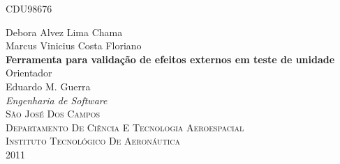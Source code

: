\begin{titlepage}
	
\begin{flushright}
\textsc{\scriptsize CDU98676}\\[1cm]	
\end{flushright}

\begin{center}
	
\textnormal{\normalsize Debora Alvez Lima Chama\\Marcus Vinicius Costa Floriano}\\[3cm]

\textnormal{\large \bfseries Ferramenta para validação de efeitos externos em teste de unidade}\\[3cm]

\textnormal{\small Orientador}\\[0cm]
\textnormal{\small Eduardo M. Guerra}\\[3cm]
\textnormal{\large \emph{Engenharia de Software}}\\[3cm]

\textsc{\small São José Dos Campos}\\[0.2cm]
\textsc{\small Departamento De Ciência E Tecnologia Aeroespacial}\\[0.2cm]
\textsc{\small Instituto Tecnológico De Aeronáutica}\\[1cm]
\textnormal{\small 2011}\\[0cm]
\end{center}

\end{titlepage}

